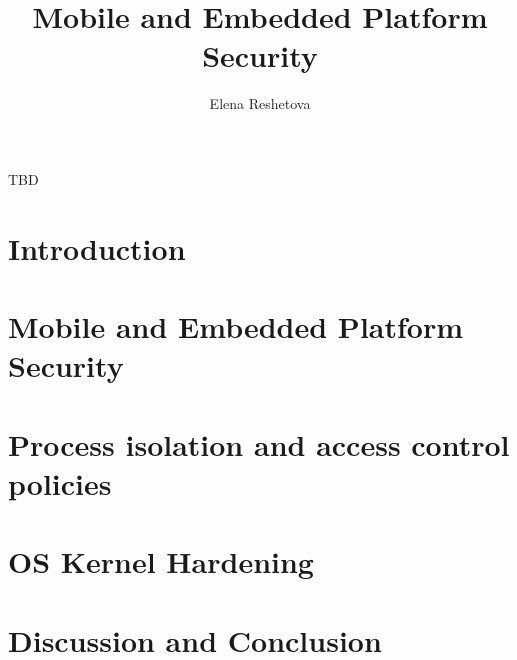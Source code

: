 \documentclass[dissertation,math,vertlayout]{aaltoseries}
\author{Elena Reshetova}
\title{Mobile and Embedded Platform Security}
\begin{document}


\begin{preface}[Sipoo]
TBD
\end{preface}

\clearpage
\tableofcontents


\listofpublications



\chapter{Introduction}
\label{sec:introduction}
                

\chapter{Mobile and Embedded Platform Security}
\label{sec:plat-sec}
 


\chapter{Process isolation and access control policies}
\label{sec:ac-policies}
 

\chapter{OS Kernel Hardening}
\label{sec:kernel-hardening}
 

\chapter{Discussion and Conclusion}
\label{sec:discussion}
 

\renewcommand{\bibname}{References}
\end{document}
